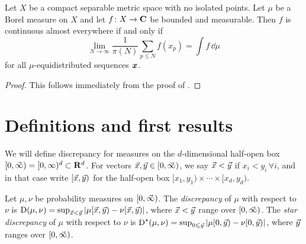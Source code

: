 \begin{theorem}
Let $X$ be a compact separable metric space with no isolated points. Let $\mu$ 
be a Borel measure on $X$ and let $f\colon X\to \mathbf{C}$ be bounded and measurable. 
Then $f$ is continuous almost everywhere if and only if 
\[
	\lim_{N\to \infty} \frac{1}{\pi(N)} \sum_{p\leqslant N} f(x_p) = \int f\, \dd\mu
\]
for all $\mu$-equidistributed sequences ${\boldsymbol x}$. 
\end{theorem}
\begin{proof}
This follows immediately from the proof of \cite[Th.~1]{mazzone-1995}. 
\end{proof}





\section{Definitions and first results}

We will define discrepancy for measures on the $d$-dimensional half-open box 
$[0,\vec{\infty}) = [0,\infty)^d\subset \mathbf{R}^d$. For vectors 
$\vec{x},\vec{y}\in [0,\vec{\infty})$, we say $\vec{x}<\vec{y}$ if $x_i<y_i\,\forall i$, and 
in that case write $[\vec{x},\vec{y})$ for the half-open box 
$[x_1,y_1)\times \cdots \times [x_d,y_d)$. 

\begin{definition}
Let $\mu, \nu$ be probability measures on $[0,\vec{\infty})$. The 
\emph{discrepancy} of $\mu$ with respect to $\nu$ is 
$\operatorname{D}(\mu,\nu) = \sup_{\vec{x} < \vec{y}} \left| \mu[\vec{x},\vec{y}) - \nu[\vec{x},\vec{y})\right|$, 
where $\vec{x}<\vec{y}$ range over $[0,\vec{\infty})$.
The \emph{star discrepancy} of $\mu$ with respect to $\nu$ is 
$\operatorname{D}^\star(\mu,\nu) = \sup_{0\leqslant \vec{y}} \left| \mu[0,\vec{y}) - \nu[0,\vec{y})\right|$, 
where $\vec{y}$ ranges over $[0,\vec{\infty})$. 
\end{definition}

